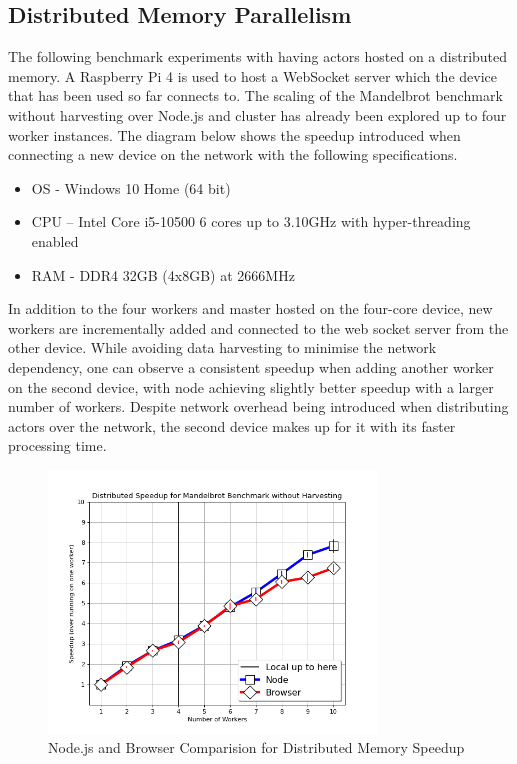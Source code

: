 \documentclass[12pt, a4paper]{report}
\theoremstyle{definition}
\theoremstyle{definition}%
\theoremstyle{definition}%
\theoremstyle{definition}%
\theoremstyle{definition}%
\theoremstyle{definition}%
\begin{document}
\subsection{Distributed Memory Parallelism}
The following benchmark experiments with having actors hosted on a distributed memory. A Raspberry Pi 4 is used to host a WebSocket server which the device that has been used so far connects to. The scaling of the Mandelbrot benchmark without harvesting over Node.js and cluster has already been explored up to four worker instances. The diagram below shows the speedup introduced when connecting a new device on the network with the following specifications.
\begin{itemize}
    \item OS - Windows 10 Home (64 bit)
    \item CPU – Intel Core i5-10500 6 cores up to 3.10GHz with hyper-threading enabled
    \item RAM - DDR4 32GB (4x8GB) at 2666MHz
\end{itemize}
In addition to the four workers and master hosted on the four-core device, new workers are incrementally added and connected to the web socket server from the other device. While avoiding data harvesting to minimise the network dependency, one can observe a consistent speedup when adding another worker on the second device, with node achieving slightly better speedup with a larger number of workers. Despite network overhead being introduced when distributing actors over the network, the second device makes up for it with its faster processing time.
\begin{figure}[H]
    \begin{centering}
        \includegraphics[width=330px]{resources/distributed_memory_speedup.png}
        \caption{Node.js and Browser Comparision for Distributed Memory Speedup}
    \end{centering}
\end{figure}
\end{document}
